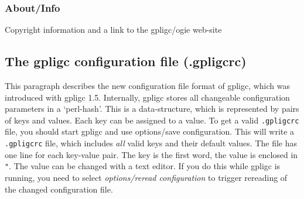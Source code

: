 


\subsubsection{About/Info}
Copyright information and a link to the gpligc/ogie web-site












\subsection{The gpligc configuration file (.gpligcrc)}
This paragraph describes the new configuration file format of gpligc, which was introduced with gpligc 1.5.
Internally, gpligc stores all changeable configuration parameters in a `perl-hash'.
This is a data-structure, which is represented by pairs of keys and values.
Each key can be assigned to a value.
To get a valid \texttt{.gpligcrc} file, you should start gpligc and use options/save configuration.
This will write a \texttt{.gpligcrc} file, which includes \emph{all} valid keys and their default values.
The file has one line for each key-value pair.
The key is the first word, the value is enclosed in \texttt{"}.
The value can be changed with a text editor.
If you do this while gpligc is running, you need to select \emph{options/reread configuration} to trigger rereading of the changed configuration file.

